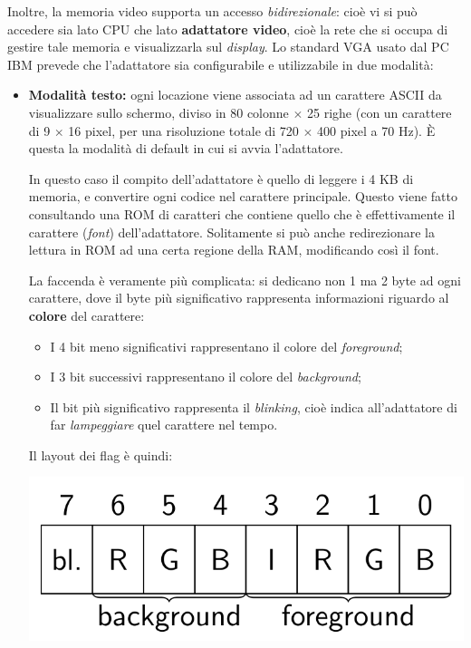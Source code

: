 \documentclass[a4paper,11pt]{article}
\begin{document}
Inoltre, la memoria video supporta un accesso \textit{bidirezionale}: cioè vi si può accedere sia lato CPU che lato \textbf{adattatore video}, cioè la rete che si occupa di gestire tale memoria e visualizzarla sul \textit{display}.
Lo standard VGA usato dal PC IBM prevede che l'adattatore sia configurabile e utilizzabile in due modalità:
\begin{itemize}
	\item \textbf{Modalità testo:} ogni locazione viene associata ad un carattere ASCII da visualizzare sullo schermo, diviso in 80 colonne $\times$ 25 righe (con un carattere di 9 $\times$ 16 pixel, per una risoluzione totale di 720 $\times$ 400 pixel a 70 Hz). È questa la modalità di default in cui si avvia l'adattatore.

		In questo caso il compito dell'adattatore è quello di leggere i 4 KB di memoria, e convertire ogni codice nel carattere principale.
		Questo viene fatto consultando una ROM di caratteri che contiene quello che è effettivamente il carattere (\textit{font}) dell'adattatore.
		Solitamente si può anche redirezionare la lettura in ROM ad una certa regione della RAM, modificando così il font.

		La faccenda è veramente più complicata: si dedicano non 1 ma 2 byte ad ogni carattere, dove il byte più significativo rappresenta informazioni riguardo al \textbf{colore} del carattere:
		\begin{itemize}
			\item I 4 bit meno significativi rappresentano il colore del \textit{foreground};
			\item I 3 bit successivi rappresentano il colore del \textit{background};
				\item Il bit più significativo rappresenta il \textit{blinking}, cioè indica all'adattatore di far \textit{lampeggiare} quel carattere nel tempo.
		\end{itemize}
		Il layout dei flag è quindi:
		\begin{center}
			\includegraphics[scale=0.4]{../figures/char_flags.png}
		\end{center}


\end{itemize}
\end{document}
